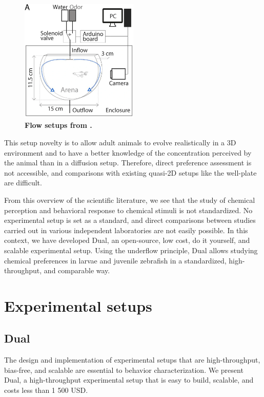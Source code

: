     \begin{figure}[h]
      \centering
      \includegraphics[width=0.5\textwidth]{part_2/assets/flow_1.png}
      \caption{\textbf{Flow setups from \cite{kermen2020stimulus}.}}
      \label{flow_1_setup}
    \end{figure}

    This setup novelty is to allow adult animals to evolve realistically in a 3D environment and to have a better knowledge of the concentration perceived by the animal than in a diffusion setup. Therefore, direct preference assessment is not accessible, and comparisons with existing quasi-2D setups like the well-plate are difficult.

    From this overview of the scientific literature, we see that the study of chemical perception and behavioral response to chemical stimuli is not standardized. No experimental setup is set as a standard, and direct comparisons between studies carried out in various independent laboratories are not easily possible. In this context, we have developed Dual, an open-source, low cost, do it yourself, and scalable experimental setup. Using the underflow principle, Dual allows studying chemical preferences in larvae and juvenile zebrafish in a standardized, high-throughput, and comparable way.

\chapter{Experimental setups}

  \section{Dual}
  The design and implementation of experimental setups that are high-throughput, bias-free, and scalable are essential to behavior characterization. We present Dual, a high-throughput experimental setup that is easy to build, scalable, and costs less than 1 500 USD.

